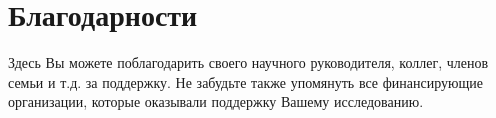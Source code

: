 \chapter*{Благодарности}
\noindent Здесь Вы можете поблагодарить своего научного руководителя, коллег, членов семьи и т.д. за поддержку.
Не забудьте также упомянуть все финансирующие организации, которые оказывали поддержку Вашему исследованию.

	